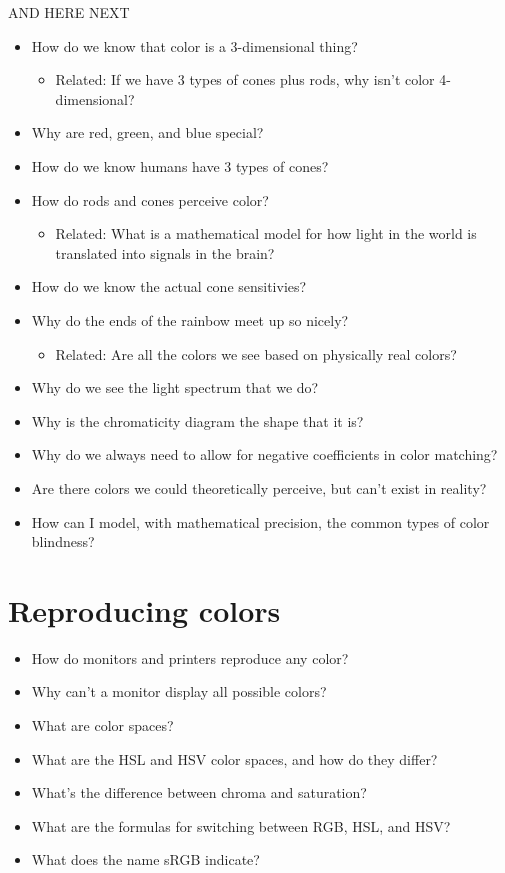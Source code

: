 \documentclass[
]{article}
\providecommand{\tightlist}{%
  \setlength{\itemsep}{0pt}\setlength{\parskip}{0pt}}
\begin{document}
AND HERE NEXT

\begin{itemize}
\tightlist
\item
  How do we know that color is a 3-dimensional thing?

  \begin{itemize}
  \tightlist
  \item
    Related: If we have 3 types of cones plus rods, why isn't color
    4-dimensional?
  \end{itemize}
\item
  Why are red, green, and blue special?
\item
  How do we know humans have 3 types of cones?
\item
  How do rods and cones perceive color?

  \begin{itemize}
  \tightlist
  \item
    Related: What is a mathematical model for how light in the world is
    translated into signals in the brain?
  \end{itemize}
\item
  How do we know the actual cone sensitivies?
\item
  Why do the ends of the rainbow meet up so nicely?

  \begin{itemize}
  \tightlist
  \item
    Related: Are all the colors we see based on physically real colors?
  \end{itemize}
\item
  Why do we see the light spectrum that we do?
\item
  Why is the chromaticity diagram the shape that it is?
\item
  Why do we always need to allow for negative coefficients in color
  matching?
\item
  Are there colors we could theoretically perceive, but can't exist in
  reality?
\item
  How can I model, with mathematical precision, the common types of
  color blindness?
\end{itemize}

\hypertarget{reproducing-colors}{%
\section{Reproducing colors}\label{reproducing-colors}}

\begin{itemize}
\tightlist
\item
  How do monitors and printers reproduce any color?
\item
  Why can't a monitor display all possible colors?
\item
  What are color spaces?
\item
  What are the HSL and HSV color spaces, and how do they differ?
\item
  What's the difference between chroma and saturation?
\item
  What are the formulas for switching between RGB, HSL, and HSV?
\item
  What does the name sRGB indicate?
\end{itemize}
\end{document}
